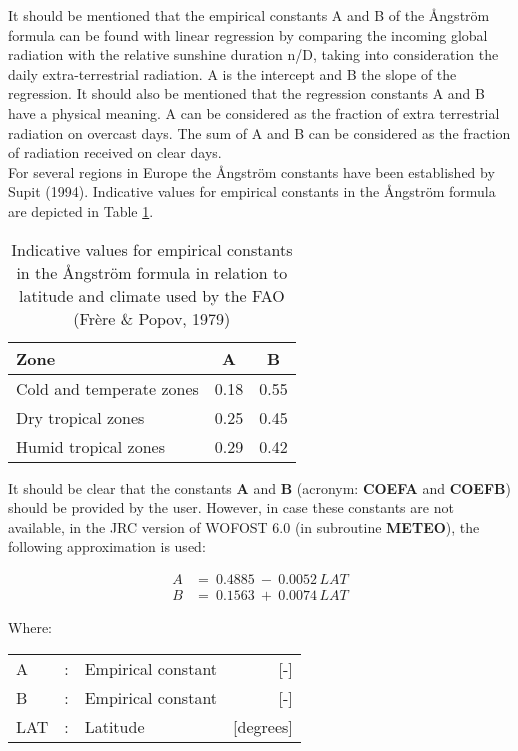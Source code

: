 It should be mentioned that the empirical constants A and B of the \AA ngstr\"{o}m formula 
can be found with linear regression by comparing the incoming global radiation with the
relative sunshine duration n/D, taking into consideration the daily extra-terrestrial
radiation. A is the intercept and B the slope of the regression. It should also be mentioned
that the regression constants A and B have a physical meaning. A can be considered as
the fraction of extra terrestrial radiation on overcast days. The sum of A and B can be
considered as the fraction of radiation received on clear days.\\
For several regions in Europe the \AA ngstr\"{o}m constants have been established by Supit
(1994). Indicative values for empirical constants in the \AA ngstr\"{o}m formula are 
depicted in Table \ref{tab:angstAB}.

\begin{table}
\centering
\caption{Indicative values for empirical constants in the \AA ngstr\"{o}m formula in
relation to latitude and climate used by the FAO (Fr\`{e}re \& Popov, 1979)}
\label{tab:angstAB}
\begin{tabular}{lcc}
\hline
Zone &   A &  B  \\
\hline
Cold and temperate zones   &  0.18 &  0.55\\
Dry tropical zones  &   0.25  & 0.45\\
Humid tropical zones  &   0.29 &  0.42\\
\hline
\end{tabular}
\end{table}

It should be clear that the constants {\bf A} and {\bf B} (acronym: {\bf COEFA} and {\bf COEFB}) should be
provided by the user. However, in case these constants are not available, in the JRC
version of WOFOST 6.0 (in subrou\-tine {\bf METEO}), the following approximation is used:

\begin{align*}
 A &=~0.4885~-~0.0052 \, LAT \\
 B &=~0.1563~+~0.0074 \, LAT 
\end{align*}

Where:\\[5pt]
\begin{tabularx}{\textwidth}{llXr}
A &:& Empirical constant  & [-]\\
B &:& Empirical constant  & [-]\\
LAT &:& Latitude  & [degrees]\\
\end{tabularx}

